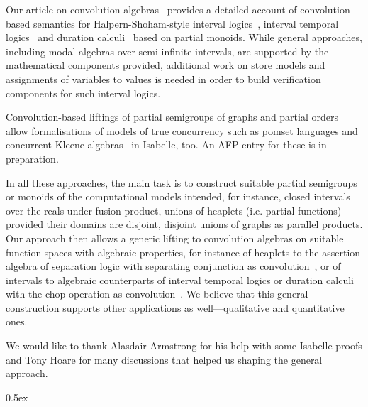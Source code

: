 \documentclass[11pt,a4paper]{article}
\begin{document}
Our article on convolution algebras~\cite{DongolHS17} provides a
detailed account of convolution-based semantics for
Halpern-Shoham-style interval logics~\cite{HalpernS91,Venema91},
interval temporal logics~\cite{Moszkowski00} and duration
calculi~\cite{ZhouH04} based on partial monoids.  While general
approaches, including modal algebras over semi-infinite intervals, are
supported by the mathematical components provided, additional work on
store models and assignments of variables to values is needed in order
to build verification components for such interval logics.

Convolution-based liftings of partial semigroups of graphs and partial
orders allow formalisations of models of true concurrency such as
pomset languages and concurrent Kleene algebras~\cite{HoareMSW11} in
Isabelle, too.  An AFP entry for these is in preparation.

In all these approaches, the main task is to construct suitable
partial semigroups or monoids of the computational models intended,
for instance, closed intervals over the reals under fusion product,
unions of heaplets (i.e. partial functions) provided their domains are
disjoint, disjoint unions of graphs as parallel products.  Our
approach then allows a generic lifting to convolution algebras on
suitable function spaces with algebraic properties, for instance of
heaplets to the assertion algebra of separation logic with separating
conjunction as convolution~\cite{DongolGS15,DongolHS16}, or of
intervals to algebraic counterparts of interval temporal logics or
duration calculi with the chop operation as
convolution~\cite{DongolHS17}.  We believe that this general
construction supports other applications as well---qualitative and
quantitative ones.

We would like to thank Alasdair Armstrong for his help with some
Isabelle proofs and Tony Hoare for many discussions that helped us
shaping the general approach.

\parindent 0pt\parskip 0.5ex




\end{document}

